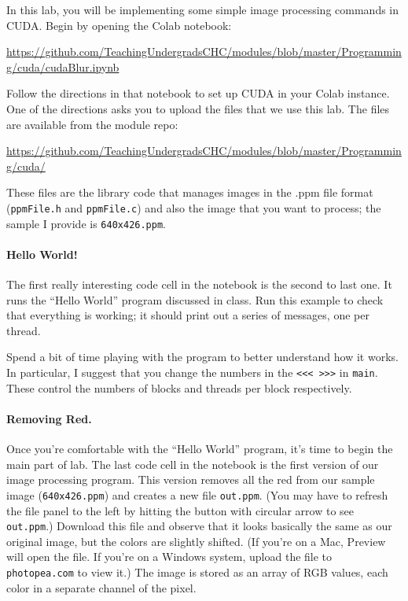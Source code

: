 \documentclass{article}
\begin{document}
In this lab, you will be implementing some simple image processing
commands in CUDA.
Begin by opening the Colab notebook:
\begin{center}
\small\url{https://github.com/TeachingUndergradsCHC/modules/blob/master/Programming/cuda/cudaBlur.ipynb}
\end{center}
Follow the directions in that notebook to set up CUDA in your Colab
instance. One of the directions asks you to upload the files that we
use this lab.
The files are available from the module repo:
\begin{center}
  \small\url{https://github.com/TeachingUndergradsCHC/modules/blob/master/Programming/cuda/}
\end{center}
These files are the library code that manages images in the .ppm
file format ({\tt ppmFile.h} and {\tt ppmFile.c}) and also the image
that you want to process; the sample I provide is {\tt 640x426.ppm}.

\paragraph{Hello World!}
The first really interesting code cell in the notebook is the second
to last one.
It runs the ``Hello World'' program discussed in class.
Run this example to check that everything is working; it should print
out a series of messages, one per thread. 

Spend a bit of time playing with the program to better understand how
it works.
In particular, I suggest that you change the numbers in the
{\tt <<< >>>} in {\tt main}.
These control the numbers of blocks and threads per block respectively.

\paragraph{Removing Red.}
Once you’re comfortable with the ``Hello World'' program, it’s
time to begin the main part of lab.
The last code cell in the notebook
is the first version of our image processing program.
This version removes all the red from our sample image ({\tt 640x426.ppm})
and creates a new file {\tt out.ppm}.
(You may have to refresh the file panel to the left
by hitting the button with circular arrow to see {\tt out.ppm}.)
Download this file and observe that it looks basically the same as our
original image, but the colors are slightly shifted.
(If you’re on a Mac, Preview will open the file.
 If you’re on a Windows system, upload the file to {\tt photopea.com} to view it.)
The image is stored as an array of RGB values, each color in a
separate channel of the pixel. 
\end{document}
